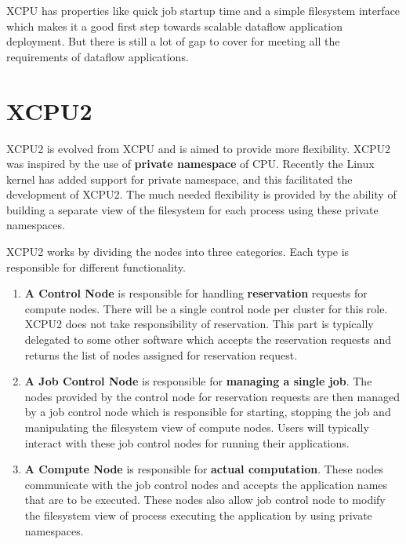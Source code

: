 XCPU has properties like quick job startup time and a simple filesystem
interface which makes it a good first step towards scalable dataflow application
deployment.  But there is still a lot of gap to cover for meeting all the requirements
of dataflow applications.


\section{XCPU2}
XCPU2 \cite{lucho-xcpu2} is evolved from XCPU and is aimed to provide more flexibility.  
XCPU2 was inspired by the use of \textbf{private namespace} of CPU.  Recently the Linux kernel 
has added support for private namespace\cite{linuxns}, and this facilitated the
development
of XCPU2.  The much needed flexibility is provided by the ability of building a separate
view of the filesystem for each process using these private namespaces.

XCPU2 works by dividing the nodes into three categories.  Each type is responsible
for different functionality.
\begin{enumerate}
	\item \textbf{A Control Node} is responsible for handling \textbf{reservation} requests for compute nodes.
There will  be a single control node per cluster for this role.  XCPU2 
does not take responsibility of reservation.  This part is typically delegated
to some other software which accepts the reservation requests and returns the
list of nodes assigned for reservation request.

	\item \textbf{A Job Control Node} is responsible for \textbf{managing a single job}.
The nodes provided by the control node for reservation requests are then managed by 
a job control node which is responsible for starting, stopping the job and manipulating
the filesystem view of compute nodes.  Users will typically interact with these
job control nodes for running their applications.

	\item \textbf{A Compute Node} is responsible for \textbf{actual computation}.
These nodes communicate with the job control nodes and accepts the application names
that are to be executed.  These nodes also allow job control node to modify the
filesystem view of process executing the application by using private namespaces.

\end{enumerate}

